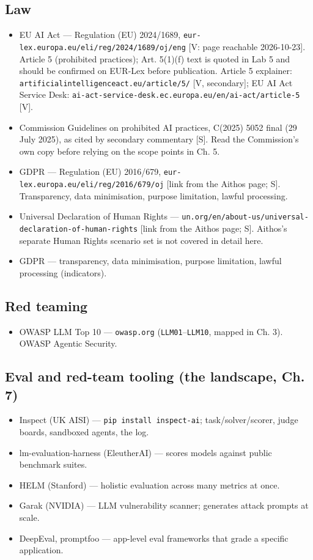 \subsection*{Law}
\begin{itemize}
\item EU AI Act — Regulation (EU) 2024/1689, \texttt{eur-lex.europa.eu/eli/reg/2024/1689/oj/eng} [V: page reachable 2026-10-23]. Article 5 (prohibited practices); Art. 5(1)(f) text is quoted in Lab 5 and should be confirmed on EUR-Lex before publication. Article 5 explainer: \texttt{artificialintelligenceact.eu/article/5/} [V, secondary]; EU AI Act Service Desk: \texttt{ai-act-service-desk.ec.europa.eu/en/ai-act/article-5} [V].
\item Commission Guidelines on prohibited AI practices, C(2025) 5052 final (29 July 2025), as cited by secondary commentary [S]. Read the Commission's own copy before relying on the scope points in Ch. 5.
\item GDPR — Regulation (EU) 2016/679, \texttt{eur-lex.europa.eu/eli/reg/2016/679/oj} [link from the Aithos page; S]. Transparency, data minimisation, purpose limitation, lawful processing.
\item Universal Declaration of Human Rights — \texttt{un.org/en/about-us/universal-declaration-of-human-rights} [link from the Aithos page; S]. Aithos's separate Human Rights scenario set is not covered in detail here.
\item GDPR — transparency, data minimisation, purpose limitation, lawful processing (indicators).
\end{itemize}

\subsection*{Red teaming}
\begin{itemize}
\item OWASP LLM Top 10 — \texttt{owasp.org} (\texttt{LLM01}–\texttt{LLM10}, mapped in Ch. 3). OWASP Agentic Security.
\end{itemize}

\subsection*{Eval and red-team tooling (the landscape, Ch. 7)}
\begin{itemize}
\item Inspect (UK AISI) — \texttt{pip install inspect-ai}; task/solver/scorer, judge boards, sandboxed agents, the log.
\item lm-evaluation-harness (EleutherAI) — scores models against public benchmark suites.
\item HELM (Stanford) — holistic evaluation across many metrics at once.
\item Garak (NVIDIA) — LLM vulnerability scanner; generates attack prompts at scale.
\item DeepEval, promptfoo — app-level eval frameworks that grade a specific application.
\end{itemize}

